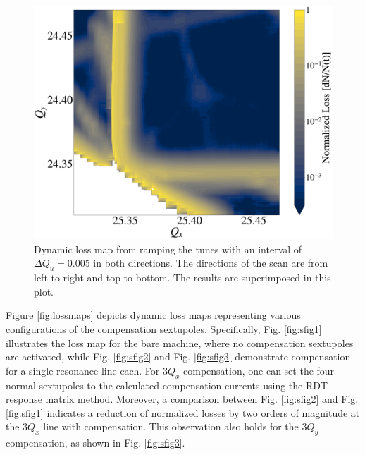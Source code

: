 \begin{figure}[H]
    \centering
    \includegraphics[width=\columnwidth]{chapter4/bare.png}
    \caption{Dynamic loss map from ramping the tunes with an interval of $\Delta Q_u=0.005$ in both directions. The directions of the scan are from left to right and top to bottom. The results are superimposed in this plot.}
    \label{fig:bare_nocomments}
\end{figure}

Figure \ref{fig:lossmaps} depicts dynamic loss maps representing various configurations of the compensation sextupoles. Specifically, Fig. \ref{fig:sfig1} illustrates the loss map for the bare machine, where no compensation sextupoles are activated, while Fig. \ref{fig:sfig2} and Fig. \ref{fig:sfig3} demonstrate compensation for a single resonance line each. For $3Q_x$ compensation, one can set the four normal sextupoles to the calculated compensation currents using the RDT response matrix method. Moreover, a comparison between Fig. \ref{fig:sfig2} and Fig. \ref{fig:sfig1} indicates a reduction of normalized losses by two orders of magnitude at the $3Q_x$ line with compensation. This observation also holds for the $3Q_y$ compensation, as shown in Fig. \ref{fig:sfig3}.

